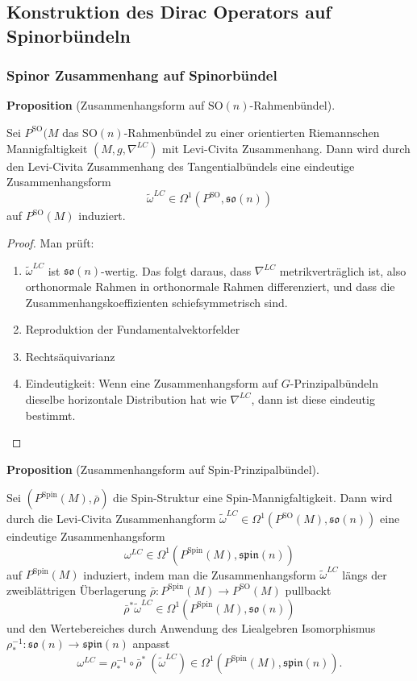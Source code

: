 \documentclass[10pt, letterpaper]{article}
\newcommand{\SO}{\mathrm{SO}}
\newcommand{\Spin}{\mathrm{Spin}}
\newcommand{\CustomHeading}[3]{%
  \par\medskip\noindent%
  \textbf{#1 #2} \textnormal{(#3)}.\enskip%
}
\newenvironment{PROP}[2]{\CustomHeading{Proposition}{#1}{#2}}{}
\begin{document}
\pagebreak


\subsection{Konstruktion des Dirac Operators auf Spinorbündeln}







\subsubsection{Spinor Zusammenhang auf Spinorbündel}

\begin{PROP}{}{Zusammenhangsform auf $\SO(n)$-Rahmenbündel}
  Sei $P^{\SO}(M$ das $\SO(n)$-Rahmenbündel zu einer orientierten Riemannschen Mannigfaltigkeit $(M,g,\nabla^{LC})$ mit Levi-Civita Zusammenhang. Dann wird durch den Levi-Civita Zusammenhang des Tangentialbündels eine eindeutige Zusammenhangsform 
  $$\widetilde\omega^{LC}\in \Omega^1(P^\SO,\mathfrak{so}(n))$$ 
  auf $P^\SO(M)$ induziert.
\end{PROP}

\begin{proof}
  Man prüft: 
  \begin{enumerate}
    \item $\widetilde{\omega}^{L C}$ ist $\mathfrak{s o}(n)$-wertig. Das folgt daraus, dass $\nabla^{L C}$ metrikverträglich ist, also orthonormale Rahmen in orthonormale Rahmen differenziert, und dass die Zusammenhangskoeffizienten schiefsymmetrisch sind. 
    \item Reproduktion der Fundamentalvektorfelder
    \item Rechtsäquivarianz
    \item Eindeutigkeit: Wenn eine Zusammenhangsform auf $G$-Prinzipalbündeln dieselbe horizontale Distribution hat wie $\nabla^{LC}$, dann ist diese eindeutig bestimmt.
  \end{enumerate} 
\end{proof}

\begin{PROP}{}{Zusammenhangsform auf Spin-Prinzipalbündel}
  Sei $(P^\Spin(M),\bar{\rho})$ die Spin-Struktur eine Spin-Mannigfaltigkeit. Dann wird durch die Levi-Civita Zusammenhangform $\widetilde\omega^{LC}\in\Omega^1(P^\SO(M),\mathfrak{so}(n))$ eine eindeutige Zusammenhangsform 
  $$\omega^{LC}\in \Omega^1(P^{\Spin}(M),\mathfrak{spin}(n))$$ 
  auf $P^\Spin(M)$ induziert, indem man die Zusammenhangsform $\widetilde\omega^{LC}$ längs der zweiblättrigen Überlagerung $\bar\rho: P^\Spin(M) \to P^\SO(M)$ pullbackt 
  $${\bar\rho}^*\widetilde\omega^{LC}\in \Omega^1(P^\Spin(M),\mathfrak{so}(n))$$
  und den Wertebereiches durch Anwendung des Liealgebren Isomorphismus $\rho_*^{-1}:\mathfrak{so}(n)\to\mathfrak{spin}(n)$ anpasst
  $$\omega^{LC}=\rho_*^{-1}\circ \bar\rho^*\ \left(\widetilde \omega^{LC}\right)\in \Omega^1(P^\Spin(M),\mathfrak{spin}(n)).$$

\end{PROP}
\end{document}
